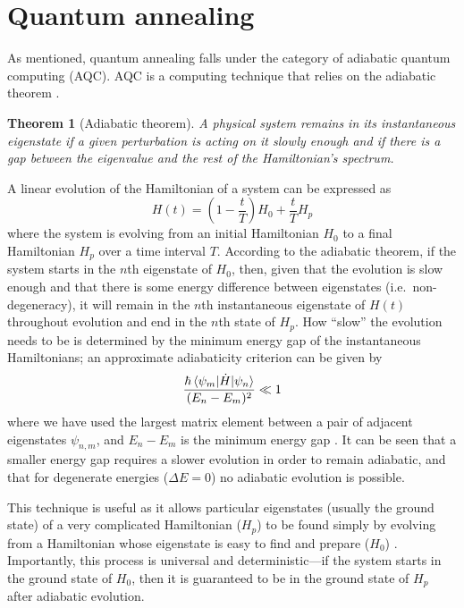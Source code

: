 \documentclass[twocolumn]{article}
\newtheorem*{theorem}{Theorem}
\theoremstyle{definition}
\begin{document}
\section*{Quantum annealing}

As mentioned, quantum annealing falls under the category of adiabatic quantum computing (AQC). AQC is a computing technique that relies on the adiabatic theorem \cite{born_beweis_1928}.

\begin{theorem}[Adiabatic theorem]
    A physical system remains in its instantaneous eigenstate if a given perturbation is acting on it slowly enough and if there is a gap between the eigenvalue and the rest of the Hamiltonian's spectrum.
    \label{thm:adiabatic}
\end{theorem}

A linear evolution of the Hamiltonian of a system can be expressed as
\begin{equation}
    H(t)=\left(1- \frac{t}{T}\right)H_0 + \frac{t}{T}H_p
    \label{eq:time-evolution}
\end{equation}
where the system is evolving from an initial Hamiltonian $H_0$ to a final Hamiltonian $H_p$ over a time interval $T$. According to the adiabatic theorem, if the system starts in the $n$th eigenstate of $H_0$, then, given that the evolution is slow enough and that there is some energy difference between eigenstates (i.e.\ non-degeneracy), it will remain in the $n$th instantaneous eigenstate of $H(t)$ throughout evolution and end in the $n$th state of $H_p$. How ``slow'' the evolution needs to be is determined by the minimum energy gap of the instantaneous Hamiltonians; an approximate adiabaticity criterion can be given by
\begin{equation}
    \frac{\hbar\braket{\psi_m|\dot{H}|\psi_n}}{(E_n-E_m)^2} \ll 1
    \label{eq:energy-gap}
\end{equation}
where we have used the largest matrix element between a pair of adjacent eigenstates $\psi_{n,m}$, and ${E_n-E_m}$ is the minimum energy gap \cite{sakurai_quantum_2020}. It can be seen that a smaller energy gap requires a slower evolution in order to remain adiabatic, and that for degenerate energies ($\Delta E=0$) no adiabatic evolution is possible.

This technique is useful as it allows particular eigenstates (usually the ground state) of a very complicated Hamiltonian ($H_p$) to be found simply by evolving from a Hamiltonian whose eigenstate is easy to find and prepare ($H_0$) \cite{farhi_quantum_2001}. Importantly, this process is universal and deterministic---if the system starts in the ground state of $H_0$, then it is guaranteed to be in the ground state of $H_p$ after adiabatic evolution.
\end{document}
